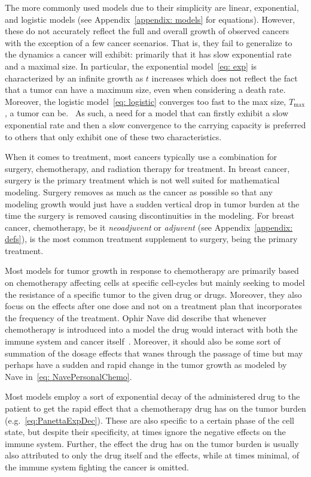 \documentclass[11pt]{amsart}
\begin{document}
The more commonly used models due to their simplicity are linear, exponential, and logistic models (see Appendix\ \ref{appendix: models} for equations).
However, these do not accurately reflect the full and overall growth of observed cancers with the exception of a few cancer scenarios.
That is, they fail to generalize to the dynamics a cancer will exhibit: primarily that it has slow exponential rate and a maximal size.
In particular, the exponential model\ \eqref{eq: exp} is characterized by an infinite growth as $t$ increases which does not reflect the fact that a tumor can have a maximum size, even when considering a death rate.
Moreover, the logistic model\ \eqref{eq: logistic} converges too fast to the max size, $T_{\max}$, a tumor can be.\ \cite{Steb23}
As such, a need for a model that can firstly exhibit a slow exponential rate and then a slow convergence to the carrying capacity is preferred to others that only exhibit one of these two characteristics.

When it comes to treatment, most cancers typically use a combination for surgery, chemotherapy, and radiation therapy for treatment.
In breast cancer, surgery is the primary treatment which is not well suited for %
mathematical modeling. 
Surgery removes as much as the cancer as possible so that any modeling growth would just have a sudden vertical drop in tumor burden at the time the surgery is removed causing discontinuities in the modeling.
For breast cancer, chemotherapy, be it \textit{neoadjuvent} or \textit{adjuvent} (see Appendix\ \ref{appendix: defs}), is the most common treatment supplement to surgery, being the primary treatment.

Most models for tumor growth in response to chemotherapy are primarily based on chemotherapy affecting cells at specific cell-cycles but mainly seeking to model the resistance of a specific tumor to the given drug or drugs.
Moreover, they also focus on the effects after one dose and not on a treatment plan that incorporates the frequency of the treatment.
Ophir Nave did describe that whenever chemotherapy is introduced into a model the drug would interact with both the immune system and cancer itself\ \cite{NAVE2022e09288}.
Moreover, it should also be some sort of summation of the dosage effects that wanes through the passage of time but may perhaps have a sudden and rapid change in the tumor growth as modeled by Nave in\ \eqref{eq: NavePersonalChemo}.

Most models employ a sort of %
exponential decay of the administered drug to the patient to get the rapid effect that a chemotherapy drug has on the tumor burden (e.g.\ \eqref{eq:PanettaExpDec}).
These are also specific to a certain phase of the cell state, but despite their specificity, at times ignore the negative effects on the immune system.
Further, the effect the drug has on the tumor burden is usually also attributed to only the drug itself and the effects, while at times minimal, of the immune system fighting the cancer is omitted.
\end{document}
